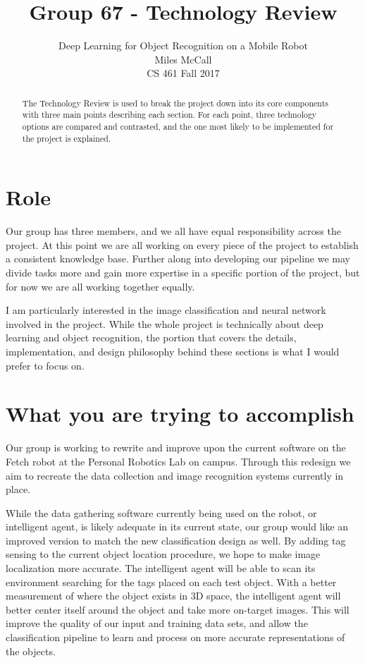 \documentclass[draftclsnofoot, onecolumn, 10pt, compsoc]{IEEEtran}
\title{Group 67 - Technology Review}
\author{
  Deep Learning for Object Recognition on a Mobile Robot \\
  Miles McCall \\
  CS 461 Fall 2017
}
\begin{document}
\maketitle

\begin{abstract}
  \begin{center}
    The Technology Review is used to break the project down into its core components with three main points describing each section. For each point, three technology options are compared and contrasted, and the one most likely to be implemented for the project is explained. 
  \end{center}
\end{abstract}
\newpage

\tableofcontents
 
\section{Role}
Our group has three members, and we all have equal responsibility across the project. At this point we are all working on every piece of the project to establish a consistent knowledge base. Further along into developing our pipeline we may divide tasks more and gain more expertise in a specific portion of the project, but for now we are all working together equally. 

I am particularly interested in the image classification and neural network involved in the project. While the whole project is technically about deep learning and object recognition, the portion that covers the details, implementation, and design philosophy behind these sections is what I would prefer to focus on. 

\section{What you are trying to accomplish}
Our group is working to rewrite and improve upon the current software on the Fetch robot at the Personal Robotics Lab on campus. Through this redesign we aim to recreate the data collection and image recognition systems currently in place.

While the data gathering software currently being used on the robot, or intelligent agent, is likely adequate in its current state, our group would like an improved version to match the new classification design as well. By adding tag sensing to the current object location procedure, we hope to make image localization more accurate. The intelligent agent will be able to scan its environment searching for the tags placed on each test object. With a better measurement of where the object exists in 3D space, the intelligent agent will better center itself around the object and take more on-target images. This will improve the quality of our input and training data sets, and allow the classification pipeline to learn and process on more accurate representations of the objects. 
\end{document}
